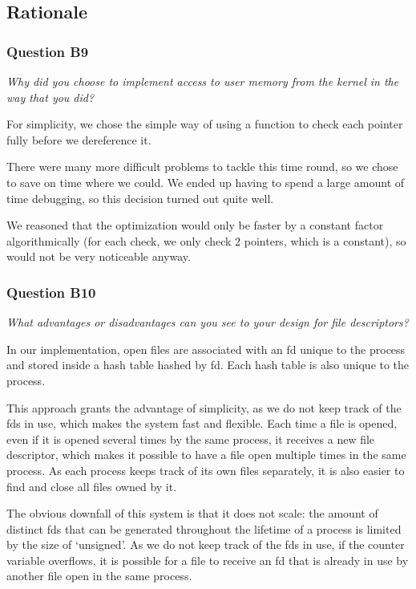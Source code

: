 \subsection{Rationale}

\subsubsection*{Question B9} %
\textit{Why did you choose to implement access to user memory from the kernel in the way that you did?}

For simplicity, we chose the simple way of using a function to check each
pointer fully before we dereference it.

There were many more difficult problems to tackle this time round, so we chose
to save on time where we could. We ended up having to spend a large amount of
time debugging, so this decision turned out quite well.

We reasoned that the optimization would only be faster by a constant factor
algorithmically (for each check, we only check 2 pointers, which is a constant),
so would not be very noticeable anyway.

\subsubsection*{Question B10} %
\textit{What advantages or disadvantages can you see to your design for file descriptors?}

In our implementation, open files are associated with an fd unique to the process and stored inside a hash table hashed by fd. Each hash table is also unique to the process.

This approach grants the advantage of simplicity, as we do not keep track of the fds in use, which makes the system fast and flexible.
Each time a file is opened, even if it is opened several times by the same process, it receives a new file descriptor, which makes it possible to have a file open multiple times in the same process.
As each process keeps track of its own files separately, it is also easier to find and close all files owned by it.

The obvious downfall of this system is that it does not scale: the amount of distinct fds that can be generated throughout the lifetime of a process is limited by the size of `unsigned'. As we do not keep track of the fds in use, if the counter variable overflows, it is possible for a file to receive an fd that is already in use by another file open in the same process.


